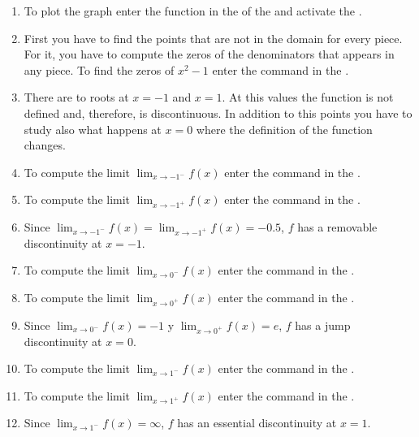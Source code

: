\begin{enumerate}[leftmargin=*]
      \begin{indication}
      \begin{enumerate}
      \item To plot the graph enter the function  in the  of the  and activate the .
      \item First you have to find the points that are not in the domain for every piece.
            For it, you have to compute the zeros of the denominators that appears in any piece.
            To find the zeros of $x^2-1$ enter the command  in the .
      \item There are to roots at $x=-1$ and $x=1$.
            At this values the function is not defined and, therefore, is discontinuous.
            In addition to this points you have to study also what happens at $x=0$ where the definition of the function changes.
      \item To compute the limit $\lim_{x\rightarrow -1^-}f(x)$ enter the command  in the .
      \item To compute the limit $\lim_{x\rightarrow -1^+}f(x)$ enter the command  in the .
      \item Since $\lim_{x\rightarrow -1^-}f(x)=\lim_{x\rightarrow -1^+}f(x)=-0.5$, $f$ has a removable discontinuity at $x=-1$.
      \item To compute the limit $\lim_{x\rightarrow 0^-}f(x)$ enter the command  in the .
      \item To compute the limit $\lim_{x\rightarrow 0^+}f(x)$ enter the command  in the .
      \item Since $\lim_{x\rightarrow 0^-}f(x)=-1$ y $\lim_{x\rightarrow 0^+}f(x)=e$, $f$ has a jump discontinuity at $x=0$.
      \item To compute the limit $\lim_{x\rightarrow 1^-}f(x)$ enter the command  in the .
      \item To compute the limit $\lim_{x\rightarrow 1^+}f(x)$ enter the command  in the .
      \item Since $\lim_{x\rightarrow 1^-}f(x)=\infty$, $f$ has an essential discontinuity at $x=1$.
      \end{enumerate}
      \end{indication}
\end{enumerate}


